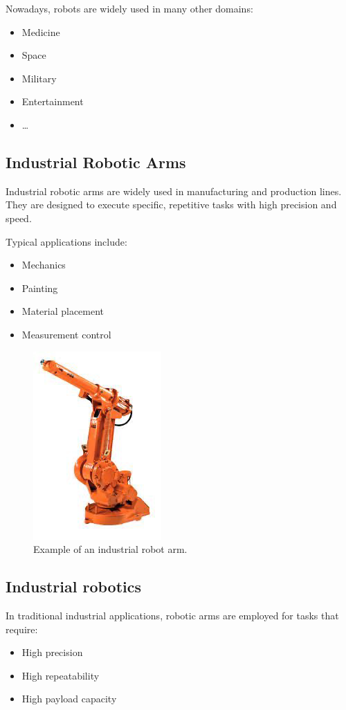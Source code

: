 Nowadays, robots are widely used in many other domains:
\begin{itemize}
  \item Medicine
  \item Space
  \item Military
  \item Entertainment
  \item \dots
\end{itemize}

\hfill

\subsection{Industrial Robotic Arms}

Industrial robotic arms are widely used in manufacturing and production lines. They are designed to execute specific, repetitive tasks with high precision and speed.

Typical applications include:
\begin{itemize}
  \item Mechanics
  \item Painting
  \item Material placement
  \item Measurement control
\end{itemize}

\hfill
\begin{figure}[H]
  \centering
  \includegraphics[width=0.2\linewidth]{imgs/industrial_robot_arm.png}
  \caption{Example of an industrial robot arm.}
\end{figure}

\hfill

\subsection{Industrial robotics}

In traditional industrial applications, robotic arms are employed for tasks that require:
\begin{itemize}
  \item High precision
  \item High repeatability
  \item High payload capacity
\end{itemize}

